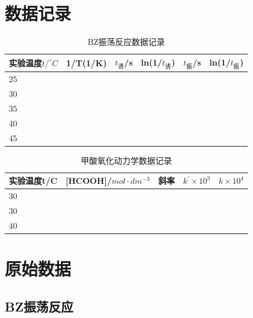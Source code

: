 \documentclass[12pt,hyperref,a4paper,UTF8]{ctexart}
\begin{document}
\clearpage


\section{数据记录}
\begin{table}[htp]
\centering
\caption{BZ振荡反应数据记录}
\begin{tabular}{|l|l|l|l|l|l|}
\hline
实验温度$t/^{\circ} C$ & 1/T(1/K) & $t_{\text{诱}}$/s & ln(1/$t_{\text{诱}}$) & $t_{\text{振}}$/s & ln(1/$t_{\text{振}}$) \\ \hline
25      &          &      &          &      &          \\ \hline
30      &          &      &          &      &          \\ \hline
35      &          &      &          &      &          \\ \hline
40      &          &      &          &      &          \\ \hline
45      &          &      &          &      &          \\ \hline
\end{tabular}
\end{table}

\begin{table}[htp]
\centering
\caption{甲酸氧化动力学数据记录}
\begin{tabular}{|l|l|l|l|l|}
\hline
实验温度t/C & {[}HCOOH{]}/$mol\cdot dm^{-3}$ & 斜率 & $k^{'} \times 10^3$ & $k\times 10^4$ \\ \hline
30      &             &    &       &      \\ \hline
30      &             &    &       &      \\ \hline
40      &             &    &       &      \\ \hline
\end{tabular}
\end{table}
\newpage

\section{原始数据}
\subsection{BZ振荡反应}
\end{document}
